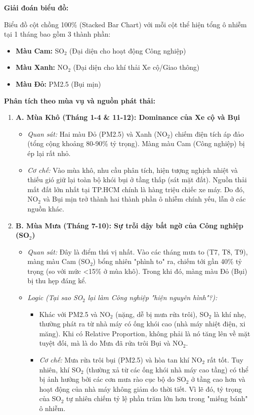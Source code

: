 \documentclass[12pt,a4paper]{article}
\begin{document}
\textbf{Giải đoán biểu đồ:}

Biểu đồ cột chồng 100\% (Stacked Bar Chart) với mỗi cột thể hiện tổng ô nhiễm tại 1 tháng bao gồm 3 thành phần:
\begin{itemize}
    \item \textbf{Màu Cam:} SO$_2$ (Đại diện cho hoạt động Công nghiệp)
    \item \textbf{Màu Xanh:} NO$_2$ (Đại diện cho khí thải Xe cộ/Giao thông)
    \item \textbf{Màu Đỏ:} PM2.5 (Bụi mịn)
\end{itemize}

\textbf{Phân tích theo mùa vụ và nguồn phát thải:}

\begin{enumerate}
    \item \textbf{A. Mùa Khô (Tháng 1-4 \& 11-12): Dominance của Xe cộ và Bụi}
    \begin{itemize}
        \item \textit{Quan sát:} Hai màu Đỏ (PM2.5) và Xanh (NO$_2$) chiếm điện tích áp đảo (tổng cộng khoảng 80-90\% tỷ trọng). Màng màu Cam (Công nghiệp) bị ép lại rất nhỏ.
        \item \textit{Cơ chế:} Vào mùa khô, nhu cầu phân tích, hiện tượng nghịch nhiệt và thiếu gió giữ lại toàn bộ khói bụi ở tầng thấp (sát mặt đất). Nguồn thải mất đất lớn nhất tại TP.HCM chính là hàng triệu chiếc xe máy. Do đó, NO$_2$ và Bụi mịn trở thành hai thành phần ô nhiễm chính yếu, lẫn ở các nguồn khác.
    \end{itemize}
    
    \item \textbf{B. Mùa Mưa (Tháng 7-10): Sự trỗi dậy bất ngờ của Công nghiệp (SO$_2$)}
    \begin{itemize}
        \item \textit{Quan sát:} Đây là điểm thú vị nhất. Vào các tháng mưa to (T7, T8, T9), màng màu Cam (SO$_2$) bổng nhiên "phình to" ra, chiếm tới gần 40\% tỷ trọng (so với mức <15\% ở mùa khô). Trong khi đó, màng màu Đỏ (Bụi) bị thu hẹp đáng kể.
        \item \textit{Logic (Tại sao SO$_2$ lại làm Công nghiệp "hiện nguyên hình"?):}
        \begin{itemize}
            \item Khác với PM2.5 và NO$_2$ (nặng, dễ bị mưa rửa trôi), SO$_2$ là khí nhẹ, thường phát ra từ nhà máy có ống khói cao (nhà máy nhiệt điện, xi măng). Khi có Relative Proportion, không phải là nó tăng lên về mặt tuyệt đối, mà là do Mưa đã rửa trôi Bụi và NO$_2$.
            \item \textit{Cơ chế:} Mưa rửa trôi bụi (PM2.5) và hòa tan khí NO$_2$ rất tốt. Tuy nhiên, khí SO$_2$ (thường xả từ các ống khói nhà máy cao tầng) có thể bị ảnh hưởng bởi các cơn mưa rào cục bộ do SO$_2$ ở tầng cao hơn và hoạt động của nhà máy không giảm do thời tiết. Vì lẽ đó, tỷ trọng của SO$_2$ tự nhiên chiếm tỷ lệ phần trăm lớn hơn trong "miếng bánh" ô nhiễm.
        \end{itemize}
    \end{itemize}
    

\end{enumerate}
\end{document}
